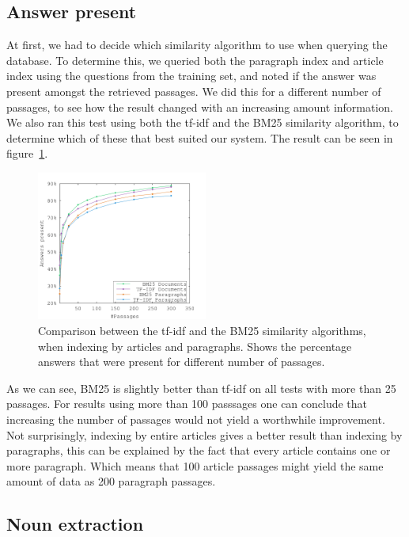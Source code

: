 \subsection{Answer present}
At first, we had to decide which similarity algorithm to use when querying the database. 
To determine this, we queried both the paragraph index and article index using the questions from the training set, 
and noted if the answer was present amongst the retrieved passages. 
We did this for a different number of passages, to see how the result changed with an increasing amount information.
We also ran this test using both the tf-idf and the BM25 similarity algorithm, 
to determine which of these that best suited our system.
The result can be seen in figure~\ref{fig:bm25_tfdf}.

\begin{figure}[h!]
  \centering
  \includegraphics[width=0.5\textwidth]{figures/bm25_tfdf.pdf}
  \caption{Comparison between the tf-idf and the BM25 similarity algorithms, when indexing by articles and paragraphs. 
  Shows the percentage answers that were present for different number of passages.}
  \label{fig:bm25_tfdf}
\end{figure}

As we can see, BM25 is slightly better than tf-idf on all tests with more than 25 passages.
For results using more than 100 passsages one can conclude that increasing the number of passages
would not yield a worthwhile improvement.
Not surprisingly, indexing by entire articles gives a better result than indexing by paragraphs, 
this can be explained by the fact that every article contains one or more paragraph. 
Which means that 100 article passages might yield the same amount of data as 200 paragraph passages.

\subsection{Noun extraction}

